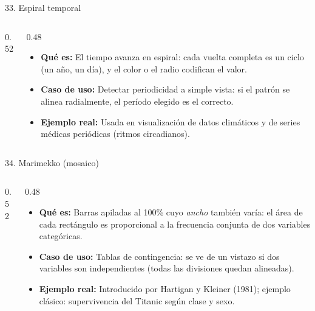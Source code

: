 \documentclass[aspectratio=169,9pt]{beamer}
\newcommand{\ficha}[3]{%
\begin{itemize}
\item \textbf{Qué es:} #1
\item \textbf{Caso de uso:} #2
\item \textbf{Ejemplo real:} #3
\end{itemize}}
\begin{document}
\begin{frame}{33. Espiral temporal}
\begin{columns}[T]
\begin{column}{0.52\textwidth}
\centering
{}
\end{column}
\begin{column}{0.48\textwidth}
\ficha{El tiempo avanza en espiral: cada vuelta completa es un ciclo (un año, un día), y el color o el radio codifican el valor.}
{Detectar periodicidad a simple vista: si el patrón se alinea radialmente, el período elegido es el correcto.}
{Usada en visualización de datos climáticos y de series médicas periódicas (ritmos circadianos).}
\end{column}
\end{columns}
\end{frame}

\begin{frame}{34. Marimekko (mosaico)}
\begin{columns}[T]
\begin{column}{0.52\textwidth}
\centering
{}
\end{column}
\begin{column}{0.48\textwidth}
\ficha{Barras apiladas al 100\% cuyo \emph{ancho} también varía: el área de cada rectángulo es proporcional a la frecuencia conjunta de dos variables categóricas.}
{Tablas de contingencia: se ve de un vistazo si dos variables son independientes (todas las divisiones quedan alineadas).}
{Introducido por Hartigan y Kleiner (1981); ejemplo clásico: supervivencia del Titanic según clase y sexo.}
\end{column}
\end{columns}
\end{frame}
\end{document}
